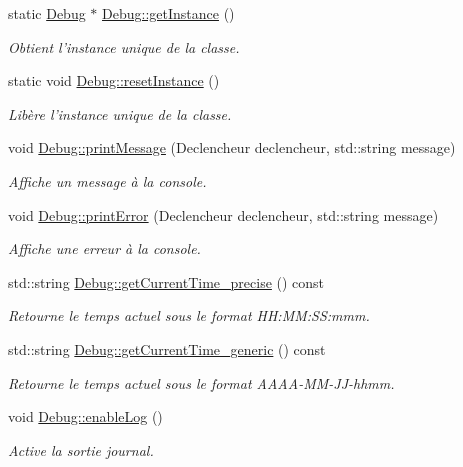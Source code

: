 \begin{DoxyCompactItemize}
\item 
static \hyperlink{class_debug}{Debug} $\ast$ \hyperlink{group__inf2990_ga823bf701dd9f4c706143dca1e8666941}{Debug\-::get\-Instance} ()
\begin{DoxyCompactList}\small\item\em Obtient l'instance unique de la classe. \end{DoxyCompactList}\item 
static void \hyperlink{group__inf2990_gacaafb83305279aafab24735adc903931}{Debug\-::reset\-Instance} ()
\begin{DoxyCompactList}\small\item\em Libère l'instance unique de la classe. \end{DoxyCompactList}\item 
void \hyperlink{group__inf2990_ga0d51f3d912211a1e4ff8232c04db8174}{Debug\-::print\-Message} (Declencheur declencheur, std\-::string message)
\begin{DoxyCompactList}\small\item\em Affiche un message à la console. \end{DoxyCompactList}\item 
void \hyperlink{group__inf2990_ga45d10d28492f6a29f44335e0f479e1f6}{Debug\-::print\-Error} (Declencheur declencheur, std\-::string message)
\begin{DoxyCompactList}\small\item\em Affiche une erreur à la console. \end{DoxyCompactList}\item 
std\-::string \hyperlink{group__inf2990_gae0f25a128c40b3019a2351d3fb1e938b}{Debug\-::get\-Current\-Time\-\_\-precise} () const 
\begin{DoxyCompactList}\small\item\em Retourne le temps actuel sous le format H\-H\-:\-M\-M\-:\-S\-S\-:mmm. \end{DoxyCompactList}\item 
std\-::string \hyperlink{group__inf2990_ga6de3f26eda6414f573d0c5f64f711dc3}{Debug\-::get\-Current\-Time\-\_\-generic} () const 
\begin{DoxyCompactList}\small\item\em Retourne le temps actuel sous le format A\-A\-A\-A-\/\-M\-M-\/\-J\-J-\/hhmm. \end{DoxyCompactList}\item 
void \hyperlink{group__inf2990_gabf9d25ff2565e30a1f481e39e4e2192f}{Debug\-::enable\-Log} ()
\begin{DoxyCompactList}\small\item\em Active la sortie journal. \end{DoxyCompactList}\item 

\end{DoxyCompactItemize}

